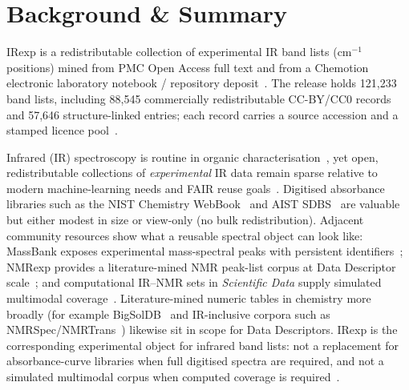 \documentclass[pdflatex,sn-nature]{sn-jnl}
\begin{document}
\maketitle

\section{Background \& Summary}\label{sec:background}

IRexp is a redistributable collection of experimental IR band lists
(cm$^{-1}$ positions) mined from PMC Open Access full text and from a
Chemotion electronic laboratory notebook / repository
deposit~\citep{tremouilhac2017chemotion,tremouilhac2020chemotionrepo,chemotion2024}.
The release holds 121,233 band lists, including 88,545 commercially
redistributable CC-BY/CC0 records and 57,646 structure-linked entries; each
record carries a source accession and a stamped licence
pool~\citep{hrynaszkiewicz2012open,carroll2011openaccess}.

Infrared (IR) spectroscopy is routine in organic characterisation~\citep{silverstein2014sioc,blum2012atrftir}, yet open,
redistributable collections of \emph{experimental} IR data remain sparse relative
to modern machine-learning needs and FAIR reuse goals~\citep{wilkinson2016fair}.
Digitised absorbance libraries such as the NIST Chemistry WebBook~\citep{nist_webbook}
and AIST SDBS~\citep{sdbs} are valuable but either modest in size or view-only
(no bulk redistribution).
Adjacent community resources show what a reusable spectral object can look like:
MassBank exposes experimental mass-spectral peaks with persistent
identifiers~\citep{horai2010massbank,neumann2026massbank}; NMRexp provides a
literature-mined NMR peak-list corpus at Data Descriptor
scale~\citep{wang2025nmrexp}; and computational IR--NMR sets in
\textit{Scientific Data} supply simulated multimodal
coverage~\citep{zipoli2025uspto,krishnadas2026squirl,alberts2024multimodal}.
Literature-mined numeric tables in chemistry more broadly (for example
BigSolDB~\citep{krasnov2025bigsoldb} and IR-inclusive corpora such as
NMRSpec/NMRTrans~\citep{yang2026nmrtrans}) likewise sit in scope for Data
Descriptors.
IRexp is the corresponding experimental object for infrared band lists: not a
replacement for absorbance-curve libraries when full digitised spectra are
required, and not a simulated multimodal corpus when computed coverage is
required~\citep{zipoli2025uspto}.
\end{document}

